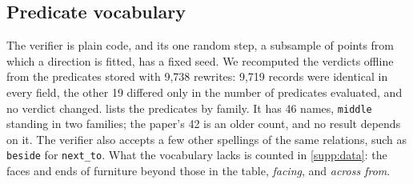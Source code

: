 \subsection{Predicate vocabulary}
\label{supp:vocab}
The verifier is plain code, and its one random step, a subsample of points from which a direction is fitted, has a fixed seed.
We recomputed the verdicts offline from the predicates stored with 9,738 rewrites: 9,719 records were identical in every field, the other 19 differed only in the number of predicates evaluated, and no verdict changed.
 lists the predicates by family.
It has 46 names, \texttt{middle} standing in two families; the paper's 42 is an older count, and no result depends on it.
The verifier also accepts a few other spellings of the same relations, such as \texttt{beside} for \texttt{next\_to}.
What the vocabulary lacks is counted in \cref{supp:data}: the faces and ends of furniture beyond those in the table, \emph{facing}, and \emph{across from}.


